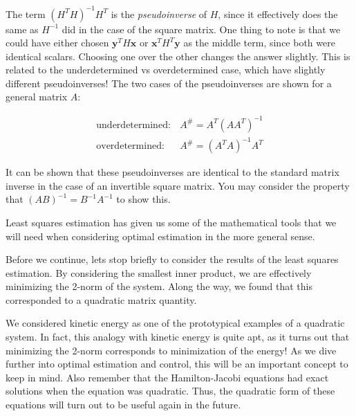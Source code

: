 The term $(H^TH)^{-1}H^T$ is the \textit{\gls{pseudoinverse}} of $H$, since it effectively does the same as $H^{-1}$ did in the case of the square matrix. One thing to note is that we could have either chosen $\bm{y}^TH\bm{x}$ or $\bm{x}^TH^T\bm{y}$ as the middle term, since both were identical scalars. Choosing one over the other changes the answer slightly. This is related to the underdetermined vs overdetermined case, which have slightly different \glspl{pseudoinverse}! The two cases of the \glspl{pseudoinverse} are shown for a general matrix $A$:

$$\begin{array}{rc}
     \mathrm{underdetermined:} & A^\#=A^T(AA^T)^{-1} \\
     \mathrm{overdetermined:} & A^\#=(A^TA)^{-1}A^T
\end{array}$$
\begin{exercise}
    It can be shown that these \glspl{pseudoinverse} are identical to the standard matrix inverse in the case of an invertible square matrix. You may consider the property that $(AB)^{-1}=B^{-1}A^{-1}$ to show this. 
\end{exercise}
Least squares estimation has given us some of the mathematical tools that we will need when considering optimal estimation in the more general sense.

Before we continue, lets stop briefly to consider the results of the least squares estimation. By considering the smallest inner product, we are effectively minimizing the 2-norm of the system. Along the way, we found that this corresponded to a quadratic matrix quantity.

We considered kinetic energy as one of the prototypical examples of a quadratic system. In fact, this analogy with kinetic energy is quite apt, as it turns out that minimizing the 2-norm corresponds to minimization of the energy! As we dive further into optimal estimation and control, this will be an important concept to keep in mind. Also remember that the Hamilton-Jacobi equations had exact solutions when the equation was quadratic. Thus, the quadratic form of these equations will turn out to be useful again in the future.

